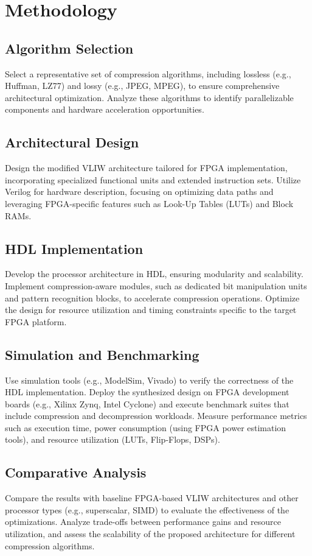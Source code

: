 \documentclass[sigconf]{acmart}
\begin{document}
	\section{Methodology}
	\subsection{Algorithm Selection}
	Select a representative set of compression algorithms, including lossless (e.g., Huffman, LZ77) and lossy (e.g., JPEG, MPEG), to ensure comprehensive architectural optimization. Analyze these algorithms to identify parallelizable components and hardware acceleration opportunities.
	
	\subsection{Architectural Design}
	Design the modified VLIW architecture tailored for FPGA implementation, incorporating specialized functional units and extended instruction sets. Utilize Verilog for hardware description, focusing on optimizing data paths and leveraging FPGA-specific features such as Look-Up Tables (LUTs) and Block RAMs.
	
	\subsection{HDL Implementation}
	Develop the processor architecture in HDL, ensuring modularity and scalability. Implement compression-aware modules, such as dedicated bit manipulation units and pattern recognition blocks, to accelerate compression operations. Optimize the design for resource utilization and timing constraints specific to the target FPGA platform.
	
	\subsection{Simulation and Benchmarking}
	Use simulation tools (e.g., ModelSim, Vivado) to verify the correctness of the HDL implementation. Deploy the synthesized design on FPGA development boards (e.g., Xilinx Zynq, Intel Cyclone) and execute benchmark suites that include compression and decompression workloads. Measure performance metrics such as execution time, power consumption (using FPGA power estimation tools), and resource utilization (LUTs, Flip-Flops, DSPs).
	
	\subsection{Comparative Analysis}
	Compare the results with baseline FPGA-based VLIW architectures and other processor types (e.g., superscalar, SIMD) to evaluate the effectiveness of the optimizations. Analyze trade-offs between performance gains and resource utilization, and assess the scalability of the proposed architecture for different compression algorithms.
	
\end{document}
